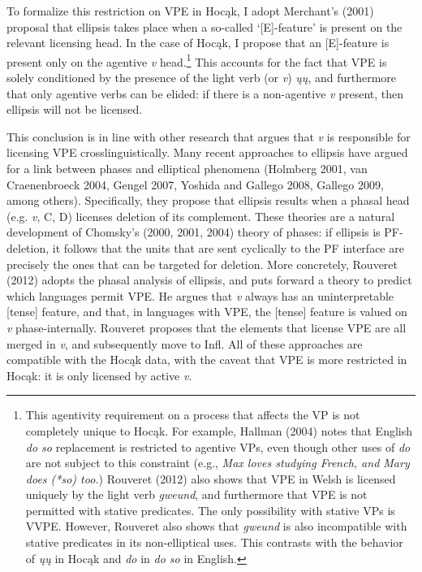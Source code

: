 \documentclass[output=paper]{LSP/langsci}
\begin{document}
To formalize this restriction on VPE in Hoc\k{a}k, I adopt Merchant's (2001) proposal that ellipsis takes place when a so-called `[E]-feature' is present on the relevant licensing head. In the case of Hoc\k{a}k, I propose that an [E]-feature is present only on the agentive \emph{v} head.\footnote{This agentivity requirement on a process that affects the VP is not completely unique to Hoc\k{a}k. For example, Hallman (2004) notes that English \emph{do so} replacement is restricted to agentive VPs, even though other uses of \emph{do} are not subject to this constraint (e.g., \emph{Max loves studying French, and Mary does (*so) too.}) Rouveret (2012) also shows that VPE in Welsh is licensed uniquely by the light verb \emph{gweund}, and furthermore that VPE is not permitted with stative predicates. The only possibility with stative VPs is VVPE. However, Rouveret also shows that \emph{gweund} is also incompatible with stative predicates in its non-elliptical uses. This contrasts with the behavior of \emph{\k{u}\k{u}} in Hoc\k{a}k and \emph{do} in \emph{do so} in English.}  This accounts for the fact that VPE is solely conditioned by the presence of the light verb (or \emph{v}) \emph{\k{u}\k{u}}, and furthermore that only agentive verbs can be elided: if there is a non-agentive \emph{v} present, then ellipsis will not be licensed. 

This conclusion is in line with other research that argues that \emph{v} is responsible for licensing VPE crosslinguistically. Many recent approaches to ellipsis have argued for a link between phases and elliptical phenomena (Holmberg 2001, van Craenenbroeck 2004, Gengel 2007, Yoshida and Gallego 2008, Gallego 2009, among others). Specifically, they propose that ellipsis results when a phasal head (e.g. \emph{v}, C, D) licenses deletion of its complement. These theories are a natural development of Chomsky's (2000, 2001, 2004) theory of phases: if ellipsis is PF-deletion, it follows that the units that are sent cyclically to the PF interface are precisely the ones that can be targeted for deletion. More concretely, Rouveret (2012) adopts the phasal analysis of ellipsis, and puts forward a theory to predict which languages permit VPE. He argues that \emph{v} always has an uninterpretable [tense] feature, and that, in languages with VPE, the [tense] feature is valued on \emph{v} phase-internally. Rouveret proposes that the elements that license VPE are all merged in \emph{v}, and subsequently move to Infl. All of these approaches are compatible with the Hoc\k{a}k data, with the caveat that VPE is more restricted in Hoc\k{a}k: it is only licensed by active \emph{v}.
\end{document}
